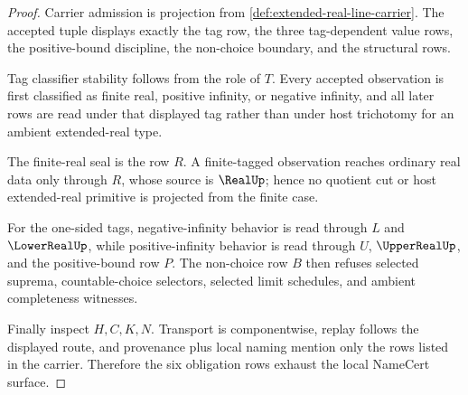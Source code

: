 \begin{proof}
Carrier admission is projection from \autoref{def:extended-real-line-carrier}. The accepted tuple displays exactly the tag row, the three tag-dependent value rows, the positive-bound discipline, the non-choice boundary, and the structural rows.

Tag classifier stability follows from the role of $T$. Every accepted observation is first classified as finite real, positive infinity, or negative infinity, and all later rows are read under that displayed tag rather than under host trichotomy for an ambient extended-real type.

The finite-real seal is the row $R$. A finite-tagged observation reaches ordinary real data only through $R$, whose source is $\RealUp$; hence no quotient cut or host extended-real primitive is projected from the finite case.

For the one-sided tags, negative-infinity behavior is read through $L$ and $\LowerRealUp$, while positive-infinity behavior is read through $U$, $\UpperRealUp$, and the positive-bound row $P$. The non-choice row $B$ then refuses selected suprema, countable-choice selectors, selected limit schedules, and ambient completeness witnesses.

Finally inspect $H,C,K,N$. Transport is componentwise, replay follows the displayed route, and provenance plus local naming mention only the rows listed in the carrier. Therefore the six obligation rows exhaust the local NameCert surface.
\end{proof}


